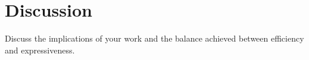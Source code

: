 \section{Discussion}

\begin{outline}
  Discuss the implications of your work and the balance achieved
  between efficiency and expressiveness.
\end{outline}
